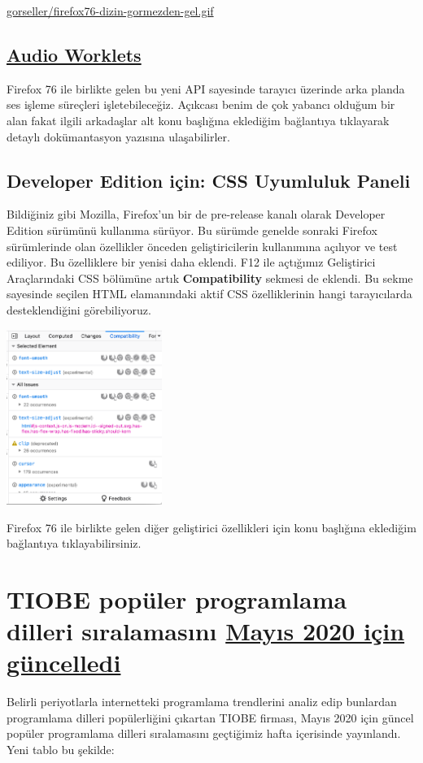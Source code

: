 \documentclass[11pt]{article}
\begin{document}
\url{gorseller/firefox76-dizin-gormezden-gel.gif}
\subsection{\href{https://developer.mozilla.org/en-US/docs/Web/API/Web\_Audio\_API/Using\_AudioWorklet}{Audio Worklets}}
\label{sec:org7f9323a}
Firefox 76 ile birlikte gelen bu yeni API sayesinde tarayıcı üzerinde arka
planda ses işleme süreçleri işletebileceğiz. Açıkcası benim de çok yabancı
olduğum bir alan fakat ilgili arkadaşlar alt konu başlığına eklediğim
bağlantıya tıklayarak detaylı dokümantasyon yazısına ulaşabilirler.
\subsection{Developer Edition için: CSS Uyumluluk Paneli}
\label{sec:orgc84809a}
Bildiğiniz gibi Mozilla, Firefox'un bir de pre-release kanalı olarak
Developer Edition sürümünü kullanıma sürüyor. Bu sürümde genelde sonraki
Firefox sürümlerinde olan özellikler önceden geliştiricilerin kullanımına
açılıyor ve test ediliyor. Bu özelliklere bir yenisi daha eklendi. F12 ile
açtığımız Geliştirici Araçlarındaki CSS bölümüne artık \textbf{Compatibility}
sekmesi de eklendi. Bu sekme sayesinde seçilen HTML elamanındaki aktif CSS
özelliklerinin hangi tarayıcılarda desteklendiğini görebiliyoruz.

\begin{center}
\includegraphics[height=5.7cm]{gorseller/firefox76-css-uyumluluk-panel.png}
\end{center}

Firefox 76 ile birlikte gelen diğer geliştirici özellikleri için konu
başlığına eklediğim bağlantıya tıklayabilirsiniz.
\section{TIOBE popüler programlama dilleri sıralamasını \href{https://jaxenter.com/c-programming-may-2020-171598.html}{Mayıs 2020 için güncelledi}}
\label{sec:orgff66bd8}
Belirli periyotlarla internetteki programlama trendlerini analiz edip
bunlardan programlama dilleri popülerliğini çıkartan TIOBE firması, Mayıs 2020
için güncel popüler programlama dilleri sıralamasını geçtiğimiz hafta
içerisinde yayınlandı. Yeni tablo bu şekilde:
\end{document}
